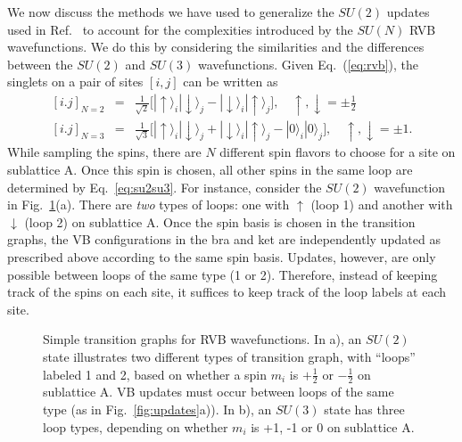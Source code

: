 \documentclass[11pt]{iopart}
\begin{document}
We now discuss the methods we have used to generalize the $SU(2)$ updates used in Ref.~\cite{RVB2,Ju2012} to account for the complexities introduced by the $SU(N)$ RVB wavefunctions.
We do this by considering the similarities and the differences between the $SU(2)$ and $SU(3)$ wavefunctions.
Given Eq.\ (\ref{eq:rvb}), the singlets on a pair of sites $[i,j]$ can be written as
%
\begin{eqnarray}
\left[i.j\right]_{N=2} &=& \frac{1}{\sqrt{2}} \big[ | \!\uparrow \rangle_i | \!\downarrow \rangle_j - | \!\downarrow \rangle_i |\! \uparrow \rangle_j \big] , \quad \uparrow,\downarrow = \pm \frac{1}{2}\\
\left[i.j\right]_{N=3} &=& \frac{1}{\sqrt{3}} \big[ |\! \uparrow \rangle_i | \!\downarrow \rangle_j + |\! \downarrow \rangle_i |\! \uparrow \rangle_j - |0\rangle_i |0\rangle_j \big] , \quad \uparrow,\downarrow = \pm 1.
\label{eq:su2su3}
\end{eqnarray}
%
While sampling the spins, there are $N$ different spin flavors to choose for a site on sublattice A.
Once this spin is chosen, all other spins in the same loop are determined by Eq.~\ref{eq:su2su3}.
For instance, consider the $SU(2)$ wavefunction in Fig.~\ref{fig:su2su3graphs}(a).
There are \textit{two} types of loops: one with $\uparrow$ (loop 1) and another with $\downarrow$ (loop 2) on sublattice A.
Once the spin basis is chosen in the transition graphs, the VB configurations in the bra and ket are independently updated as prescribed above according to the same spin basis.
Updates, however, are only possible between loops of the same type (1 or 2).
Therefore, instead of keeping track of the spins on each site, it suffices to keep track of the loop labels at each site.
%
\begin{figure}[t]
 \begin{center}
 \end{center}
 \caption{Simple transition graphs for RVB wavefunctions.  In a), an $SU(2)$ state illustrates two different types of transition graph, with ``loops'' labeled 1 and 2, based on whether a spin $m_i$ is $+\frac{1}{2}$ or $-\frac{1}{2}$ on sublattice A.  VB updates must occur between loops of the same type (as in Fig.~\ref{fig:updates}a)).  In b), an $SU(3)$ state has three loop types, depending on whether $m_i$ is +1, -1 or 0 on sublattice A.
 \label{fig:su2su3graphs} }
 \end{figure}
%
\end{document}
